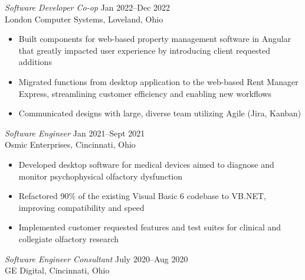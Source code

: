 \documentclass[margin]{res} %
\begin{document}
\begin{resume}

{\sl Software Developer Co-op} \hfill {\color{black} Jan 2022–Dec 2022}  \\
London Computer Systems, Loveland, Ohio 
\vspace{1mm}
\begin{itemize}  %
\item Built components for web-based property management software in Angular that greatly impacted user experience by introducing client requested additions
\item Migrated functions from desktop application to the web-based Rent Manager Express, streamlining customer efficiency and enabling new workflows
\item Communicated designs with large, diverse team utilizing Agile (Jira, Kanban)
\end{itemize}


{\sl Software Engineer} \hfill {\color{black} Jan 2021–Sept 2021}  \\
Osmic Enterprises, Cincinnati, Ohio
\vspace{1mm}
\begin{itemize} %
\item Developed desktop software for medical devices aimed to diagnose and monitor psychophysical olfactory dysfunction
\item Refactored 90\% of the existing Visual Basic 6 codebase to VB.NET, improving compatibility and speed   
\item Implemented customer requested features and test suites for clinical and collegiate olfactory research
\end{itemize}


{\sl Software Engineer Consultant} \hfill {\color{black} July 2020–Aug 2020}  \\
GE Digital, Cincinnati, Ohio 

\pagebreak




\end{resume}
\end{document}
